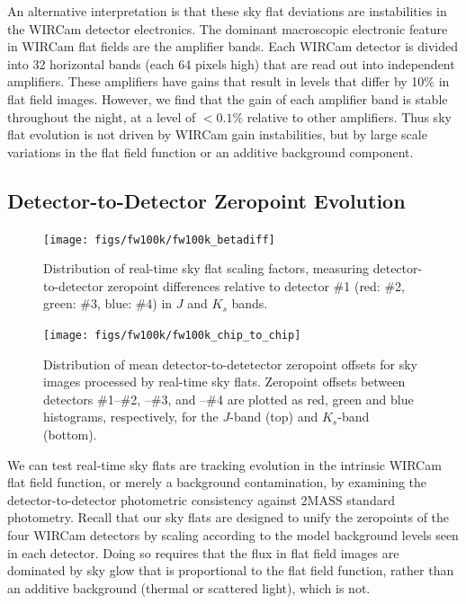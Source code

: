 \documentclass[iop]{emulateapj}
\newcommand{\Fig}[1]{Fig.~\ref{fig:#1}}  %
\begin{document}

An alternative interpretation is that these sky flat deviations are instabilities in the WIRCam detector electronics.
The dominant macroscopic electronic feature in WIRCam flat fields are the amplifier bands.
Each WIRCam detector is divided into 32 horizontal bands (each 64 pixels high) that are read out into independent amplifiers.
These amplifiers have gains that result in levels that differ by 10\% in flat field images.
However, we find that the gain of each amplifier band is stable throughout the night, at a level of $<0.1\%$ relative to other amplifiers.
Thus sky flat evolution is not driven by WIRCam gain instabilities, but by large scale variations in the flat field function or an additive background component.

\subsection{Detector-to-Detector Zeropoint Evolution}
\label{sec:detector_zp}

\begin{figure}[t]
\centering
\texttt{[image: figs/fw100k/fw100k\_betadiff]}
\caption{Distribution of real-time sky flat scaling factors, measuring detector-to-detector zeropoint differences relative to detector \#1 (red: \#2, green: \#3, blue: \#4) in $J$ and $K_s$ bands.
}
\label{fig:fw100k_zpdiff}
\end{figure}

\begin{figure}[t]
\centering
\texttt{[image: figs/fw100k/fw100k\_chip\_to\_chip]}
\caption{Distribution of mean detector-to-detetector zeropoint offsets for sky images processed by real-time sky flats. Zeropoint offsets between detectors \#1--\#2, --\#3, and --\#4 are plotted as
red, green and blue histograms, respectively, for the $J$-band (top) and $K_s$-band (bottom).}
\label{fig:fw100k_chip_to_chip}
\end{figure}

We can test real-time sky flats are tracking evolution in the intrinsic WIRCam flat field function, or merely a background contamination, by examining the detector-to-detector photometric consistency against 2MASS standard photometry.
Recall that our sky flats are designed to unify the zeropoints of the four WIRCam detectors by scaling according to the model background levels seen in each detector.
Doing so requires that the flux in flat field images are dominated by sky glow that is proportional to the flat field function, rather than an additive background (thermal or scattered light), which is not.
\end{document}
